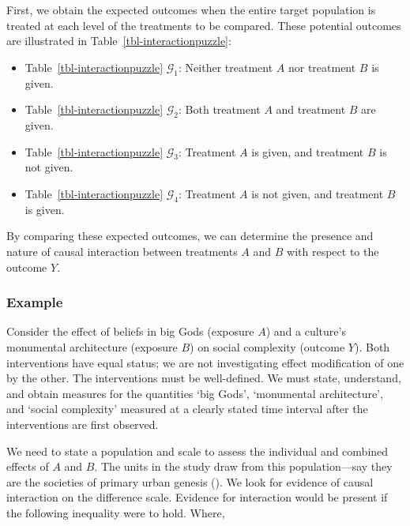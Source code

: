 \documentclass[
  single column]{article}
\providecommand{\tightlist}{%
  \setlength{\itemsep}{0pt}\setlength{\parskip}{0pt}}\usepackage{longtable,booktabs,array}
\begin{document}
First, we obtain the expected outcomes when the entire target population
is treated at each level of the treatments to be compared. These
potential outcomes are illustrated in Table~\ref{tbl-interactionpuzzle}:

\begin{itemize}
\tightlist
\item
  Table~\ref{tbl-interactionpuzzle} \(\mathcal{G}_1\): Neither treatment
  \(A\) nor treatment \(B\) is given.
\item
  Table~\ref{tbl-interactionpuzzle} \(\mathcal{G}_2\): Both treatment
  \(A\) and treatment \(B\) are given.
\item
  Table~\ref{tbl-interactionpuzzle} \(\mathcal{G}_3\): Treatment \(A\)
  is given, and treatment \(B\) is not given.
\item
  Table~\ref{tbl-interactionpuzzle} \(\mathcal{G}_4\): Treatment \(A\)
  is not given, and treatment \(B\) is given.
\end{itemize}

By comparing these expected outcomes, we can determine the presence and
nature of causal interaction between treatments \(A\) and \(B\) with
respect to the outcome \(Y\).

\begin{table}

\caption{\label{tbl-interactionpuzzle}}

\centering{

\captionsetup{labelsep=none}

\interactionpuzzle

}

\end{table}%

\subsubsection{Example}\label{example}

Consider the effect of beliefs in big Gods (exposure \(A\)) and a
culture's monumental architecture (exposure \(B\)) on social complexity
(outcome \(Y\)). Both interventions have equal status; we are not
investigating effect modification of one by the other. The interventions
must be well-defined. We must state, understand, and obtain measures for
the quantities `big Gods', `monumental architecture', and `social
complexity' measured at a clearly stated time interval after the
interventions are first observed.

We need to state a population and scale to assess the individual and
combined effects of \(A\) and \(B\). The units in the study draw from
this population---say they are the societies of primary urban genesis
(). We look for evidence
of causal interaction on the difference scale. Evidence for interaction
would be present if the following inequality were to hold. Where,
\end{document}
